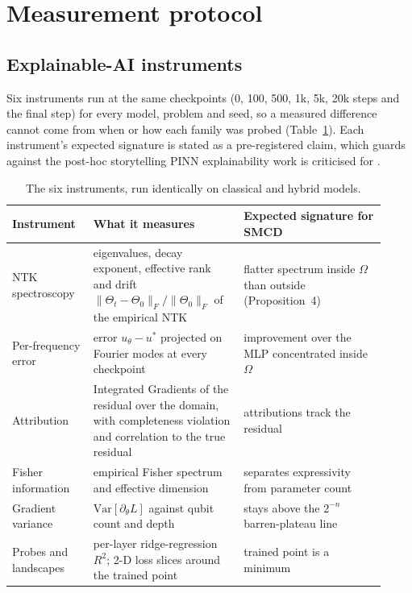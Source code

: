 \section{Measurement protocol}
\label{sec:xai}

\subsection{Explainable-AI instruments}
Six instruments run at the same checkpoints (0, 100, 500, 1k, 5k, 20k steps and the final
step) for every model, problem and seed, so a measured difference cannot come from when or
how each family was probed (Table~\ref{tab:instruments}). Each instrument's expected
signature is stated as a pre-registered claim, which guards against the post-hoc
storytelling PINN explainability work is criticised for \citep{fundamental_flaws_pinns}.

\begin{table}[htbp]
  \centering
  \small
  \begin{tabular}{p{0.2\linewidth}p{0.37\linewidth}p{0.35\linewidth}}
  \toprule
  Instrument & What it measures & Expected signature for SMCD \\
  \midrule
  NTK spectroscopy \citep{ntk_pikans_2506} & eigenvalues, decay exponent, effective rank
    and drift $\|\Theta_t-\Theta_0\|_F/\|\Theta_0\|_F$ of the empirical NTK & flatter
    spectrum inside $\Omega$ than outside (Proposition~4) \\
  Per-frequency error & error $u_\theta-u^*$ projected on Fourier modes at every checkpoint
    & improvement over the MLP concentrated inside $\Omega$ \\
  Attribution & Integrated Gradients of the residual over the domain, with completeness
    violation and correlation to the true residual & attributions track the residual \\
  Fisher information & empirical Fisher spectrum and effective dimension
    \citep{abbas2021effdim} & separates expressivity from parameter count \\
  Gradient variance & $\mathrm{Var}[\partial_\theta L]$ against qubit count and depth &
    stays above the $2^{-n}$ barren-plateau line \citep{mcclean2018barren} \\
  Probes and landscapes & per-layer ridge-regression $R^2$; 2-D loss slices around the
    trained point & trained point is a minimum \\
  \bottomrule
  \end{tabular}
  \caption{The six instruments, run identically on classical and hybrid models.}
  \label{tab:instruments}
\end{table}


